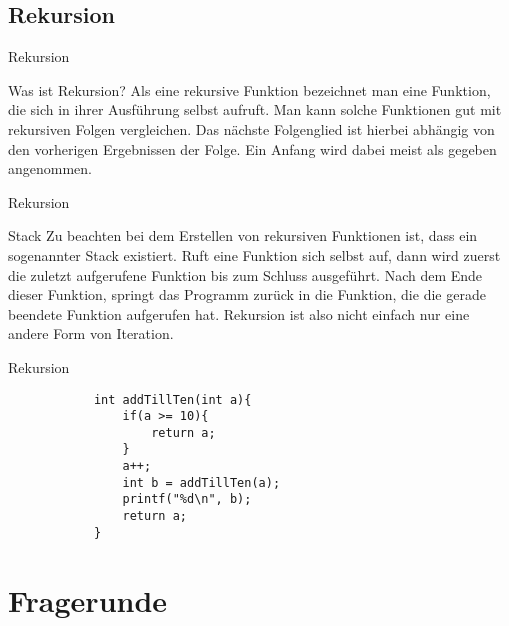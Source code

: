 \documentclass[usenames,dvipsnames,10pt]{beamer}
\begin{document}
    \subsection{Rekursion}
    \begin{frame}{Rekursion}
        \begin{block}{Was ist Rekursion?}
            Als eine rekursive Funktion bezeichnet man eine Funktion, die sich in ihrer Ausführung selbst aufruft.
            Man kann solche Funktionen gut mit rekursiven Folgen vergleichen. Das nächste Folgenglied ist hierbei abhängig von 
            den vorherigen Ergebnissen der Folge. Ein Anfang wird dabei meist als gegeben angenommen.
        \end{block}
    \end{frame}
    \begin{frame}{Rekursion}
        \begin{block}{Stack}
            Zu beachten bei dem Erstellen von rekursiven Funktionen ist, dass ein sogenannter Stack existiert. Ruft eine Funktion sich selbst auf,
            dann wird zuerst die zuletzt aufgerufene Funktion bis zum Schluss ausgeführt. Nach dem Ende dieser Funktion, springt das Programm zurück 
            in die Funktion, die die gerade beendete Funktion aufgerufen hat. Rekursion ist also nicht einfach nur eine andere Form von Iteration.
        \end{block}
    \end{frame}
    \begin{frame}[fragile]{Rekursion}
        \begin{lstlisting}
            int addTillTen(int a){
                if(a >= 10){
                    return a;
                }
                a++;
                int b = addTillTen(a);
                printf("%d\n", b);
                return a;
            }
        \end{lstlisting}
    \end{frame}
    \section{Fragerunde}
\end{document}
